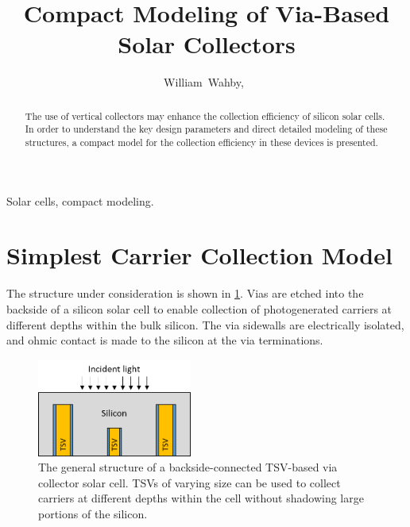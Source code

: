 \documentclass[journal,twoside]{IEEEtran}
\begin{document}

\title{Compact Modeling of Via-Based Solar Collectors}
\author{William~Wahby,~}


\maketitle



\begin{abstract}
The use of vertical collectors may enhance the collection efficiency of silicon solar cells.
In order to understand the key design parameters and direct detailed modeling of these structures,
a compact model for the collection efficiency in these devices is presented.
\end{abstract}

\begin{IEEEkeywords}
Solar cells, compact modeling.
\end{IEEEkeywords}

\section{Simplest Carrier Collection Model}
The structure under consideration is shown in \cref{f-via-collector-structure}. Vias are etched into the backside
of a silicon solar cell to enable collection of photogenerated carriers at different depths within the bulk silicon.
The via sidewalls are electrically isolated, and ohmic contact is made to the silicon at the via terminations.

\begin{figure}[tb]
	\centering
	\includegraphics[width=2.0in]{figures/structure_general.png}
	\caption{	The general structure of a backside-connected TSV-based via collector solar cell.
				TSVs of varying size can be used to collect carriers at different depths within the cell without
			shadowing large portions of the silicon.}
	\label{f-via-collector-structure}
\end{figure}
\end{document}
